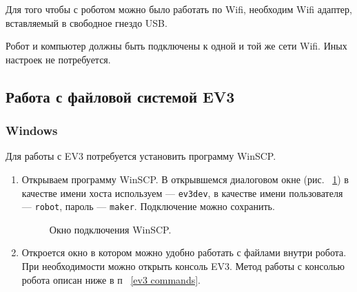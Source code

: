 \documentclass[12pt,a4paper,openany]{extarticle}
\begin{document}
\hspace*{\parindent}Для того чтобы с роботом можно было работать по Wifi, необходим Wifi адаптер, вставляемый в свободное гнездо USB. 

Робот и компьютер должны быть подключены к одной и той же сети Wifi. Иных настроек не потребуется.


\subsection{Работа с файловой системой EV3}

\subsubsection{Windows}


Для работы с EV3 потребуется установить программу WinSCP.
\begin{enumerate}
\item Открываем программу WinSCP. В открывшемся диалоговом окне (рис. ~\ref{WinSCP_connection}) в качестве имени хоста используем --- \verb|ev3dev|, в качестве имени пользователя --- \verb|robot|, пароль --- \verb|maker|. Подключение можно сохранить.

\begin{figure}[h!]
	\noindent{}
	\caption{Окно подключения WinSCP.}
	\label{WinSCP_connection}
\end{figure}

\item Откроется окно в котором можно удобно работать с файлами внутри робота. При необходимости можно открыть консоль EV3. Метод работы с консолью робота описан ниже в п ~\ref{ev3 commands}.

\end{enumerate}
\end{document}
